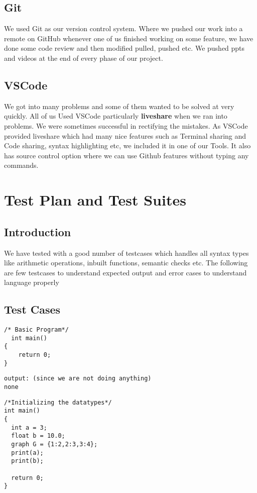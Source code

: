 \documentclass[english,a4paper,12pt]{report}
\begin{document}
  \section{Git}
    We used Git as our version control system. Where we pushed our work into a remote on GitHub whenever one of us finished working on some feature, we have done some code review and then modified pulled, pushed etc. We pushed ppts and videos at the end of every phase of our project.
    
  \section{VSCode}
   We got into many problems and some of them wanted to be solved at very quickly. All of us Used VSCode particularly \textbf{liveshare} when we ran into problems. We were sometimes successful in rectifying the mistakes. As VSCode provided liveshare which had many nice features such as Terminal sharing and Code sharing, syntax highlighting etc, we included it in one of our Tools. It also has source control option where we can use Github features without typing any commands. 

\chapter{Test Plan and Test Suites}
\section{Introduction}
We have tested with a good number of testcases which handles all syntax types 
like arithmetic operations, inbuilt functions, semantic checks etc. The following
are few testcases to understand expected output and error cases to understand language
properly
\section{Test Cases}
\begin{lstlisting}[style=CStyle]
/* Basic Program*/
  int main()
{
    return 0;
}
\end{lstlisting}

\begin{lstlisting}
output: (since we are not doing anything)
none 
\end{lstlisting}
\begin{lstlisting}[style=CStyle]
/*Initializing the datatypes*/
int main()
{
  int a = 3;
  float b = 10.0;
  graph G = {1:2,2:3,3:4};
  print(a);
  print(b);

  return 0;
}
\end{lstlisting}
\end{document}
